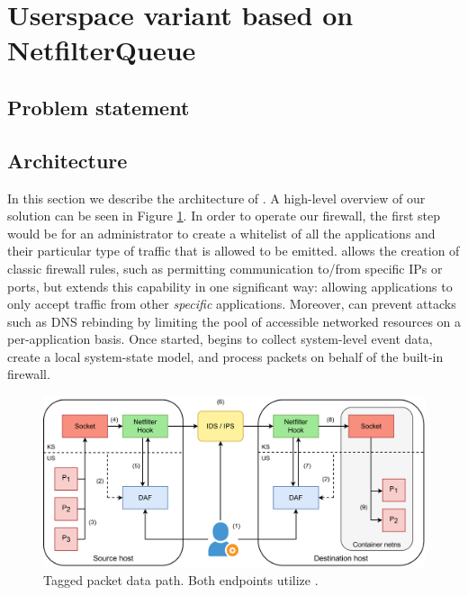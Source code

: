 \section{Userspace variant based on NetfilterQueue}
\label{appfw:daf}

\subsection{Problem statement}


\subsection{Architecture}
\label{apffw:daf:architecture}

In this section we describe the architecture of \daf{}. A high-level overview of our solution can be seen in Figure \ref{appfw:daf:fig:sys-architecture}. In order to operate our firewall, the first step would be for an administrator to create a whitelist of all the applications and their particular type of traffic that is allowed to be emitted. \daf{} allows the creation of classic firewall rules, such as permitting communication to/from specific IPs or ports, but extends this capability in one significant way: allowing applications to only accept traffic from other \textit{specific} applications. Moreover, \daf{} can prevent attacks such as DNS rebinding by limiting the pool of accessible networked resources on a per-application basis. Once started, \daf{} begins to collect system-level event data, create a local system-state model, and process packets on behalf of the built-in firewall.

\begin{figure}
    \centering
    \includegraphics[width=\textwidth,keepaspectratio]{figures/daf-sys-architecture.pdf}
    \caption{Tagged packet data path. Both endpoints utilize \daf{}.}
    \label{appfw:daf:fig:sys-architecture}
\end{figure}

